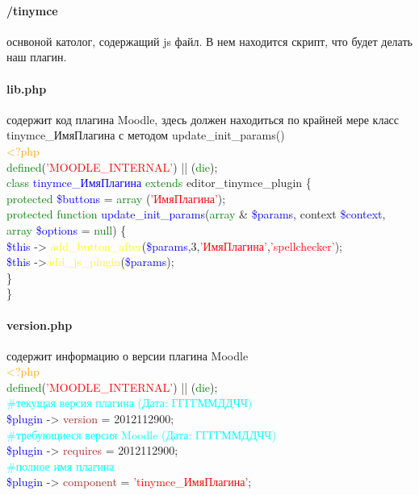 \documentclass[14pt,Diplom]{diplomwork}
\begin{document}
\paragraph{/tinymce}
оснвоной католог, содержащий js файл. В нем находится скрипт, что будет делать наш плагин.

\paragraph{lib.php}
содержит код плагина Moodle, здесь должен находиться по крайней мере класс tinymce\_ИмяПлагина с методом update\_init\_params()\\
 \textcolor{orange}{<?php} \\
 \textcolor{green}{defined}(\textcolor{red}{'MOODLE\_INTERNAL'}) || (\textcolor{green}{die});\\
 
\textcolor{green}{class} \textcolor{blue}{tinymce\_ИмяПлагина} \textcolor{green}{extends} editor\_tinymce\_plugin \{ \\
\textcolor{green}{protected} \textcolor{blue}{\$buttons} = \textcolor{green}{array} (\textcolor{red}{'ИмяПлагина'}); \\

\textcolor{green}{protected function} \textcolor{blue}{update\_init\_params}(\textcolor{green}{array} \& \textcolor{blue}{\$params}, context \textcolor{blue}{\$context}, \textcolor{green}{array} \textcolor{blue}{\$options} = \textcolor{green}{null}) \{ \\

\textcolor{blue}{\$this} -> \textcolor{yellow}{add\_button\_after}(\textcolor{blue}{\$params},3,\textcolor{red}{'ИмяПлагина'},\textcolor{red}{'spellchecker'});\\

\textcolor{blue}{\$this} ->\textcolor{yellow}{add\_js\_plugin}(\textcolor{blue}{\$params});\\

 \}\\
\}\\


 \paragraph{version.php}
 содержит информацию о версии плагина Moodle\\
  \textcolor{orange}{<?php} \\
 \textcolor{green}{defined}(\textcolor{red}{'MOODLE\_INTERNAL'}) || (\textcolor{green}{die});\\
 \textcolor{cyan}{\#текущая версия плагина (Дата: ГГГГММДДЧЧ)}\\
 \textcolor{blue}{\$plugin} -> \textcolor{brown}{version} = 2012112900; \\
 \textcolor{cyan}{\#требующиеся версия Moodle (Дата: ГГГГММДДЧЧ)}\\
 \textcolor{blue}{\$plugin} -> \textcolor{brown}{requires} = 2012112900; \\
 \textcolor{cyan}{\#полное имя плагина}\\
 \textcolor{blue}{\$plugin} -> \textcolor{brown}{component} = \textcolor{red}{'tinymce\_ИмяПлагина'}; \\
 
\end{document}
